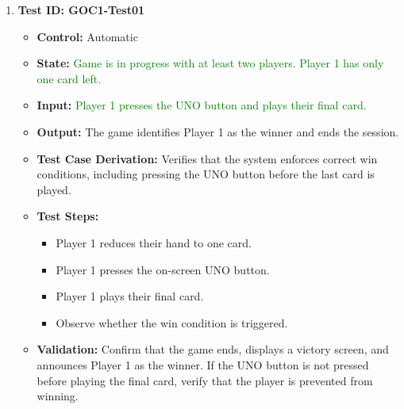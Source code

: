 \documentclass[12pt]{article}
\newcommand{\added}[1]{\textcolor{green}{#1}}
\begin{document}
\begin{enumerate}
    \item \textbf{Test ID: GOC1-Test01}
    \begin{itemize}
        \item \textbf{Control:} Automatic
        \item \textbf{State:} \added{Game is in progress with at least two players. Player 1 has only one card left.}
        \item \textbf{Input:} \added{Player 1 presses the UNO button and plays their final card.}
        \item \textbf{Output:} The game identifies Player 1 as the winner and ends the session.
        \item \textbf{Test Case Derivation:} Verifies that the system enforces correct win conditions, including pressing the UNO button before the last card is played.
        \item \textbf{Test Steps:}
        \begin{itemize}
            \item Player 1 reduces their hand to one card.
            \item Player 1 presses the on-screen UNO button.
            \item Player 1 plays their final card.
            \item Observe whether the win condition is triggered.
        \end{itemize}
        \item \textbf{Validation:} Confirm that the game ends, displays a victory screen, and announces Player 1 as the winner. If the UNO button is not pressed before playing the final card, verify that the player is prevented from winning.
    \end{itemize}


\end{enumerate}
\end{document}
